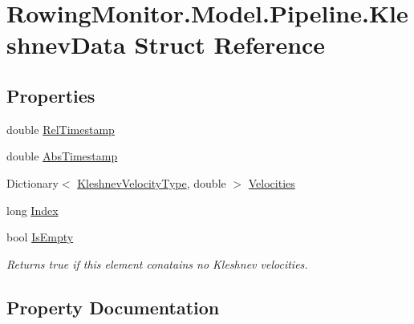 \hypertarget{struct_rowing_monitor_1_1_model_1_1_pipeline_1_1_kleshnev_data}{}\section{Rowing\+Monitor.\+Model.\+Pipeline.\+Kleshnev\+Data Struct Reference}
\label{struct_rowing_monitor_1_1_model_1_1_pipeline_1_1_kleshnev_data}
\subsection*{Properties}
\begin{DoxyCompactItemize}
\item 
double \hyperlink{struct_rowing_monitor_1_1_model_1_1_pipeline_1_1_kleshnev_data_ab0f0ba7b2c4c9ec7248fca81c9a5f482}{Rel\+Timestamp}
\item 
double \hyperlink{struct_rowing_monitor_1_1_model_1_1_pipeline_1_1_kleshnev_data_ad59fa89e9efe861ab2c0afd23297a62a}{Abs\+Timestamp}
\item 
Dictionary$<$ \hyperlink{namespace_rowing_monitor_1_1_model_1_1_util_a45e0956b123d438555a1cb3997bd5cb4}{Kleshnev\+Velocity\+Type}, double $>$ \hyperlink{struct_rowing_monitor_1_1_model_1_1_pipeline_1_1_kleshnev_data_a62142432ba1620e06b133e9119b33493}{Velocities}
\item 
long \hyperlink{struct_rowing_monitor_1_1_model_1_1_pipeline_1_1_kleshnev_data_a1b21f8ca17372b1da98a8f0126c5bcf2}{Index}
\item 
bool \hyperlink{struct_rowing_monitor_1_1_model_1_1_pipeline_1_1_kleshnev_data_ab24e99ca9880f363559b2cdd81bbda5b}{Is\+Empty}
\begin{DoxyCompactList}\small\item\em Returns true if this element conatains no Kleshnev velocities. \end{DoxyCompactList}\end{DoxyCompactItemize}


\subsection{Property Documentation}
\mbox{\label{struct_rowing_monitor_1_1_model_1_1_pipeline_1_1_kleshnev_data_ad59fa89e9efe861ab2c0afd23297a62a}} 
